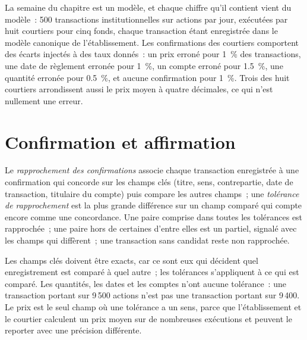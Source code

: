 La semaine du chapitre est un modèle, et chaque chiffre qu'il contient vient du modèle~: 500 transactions institutionnelles sur actions par jour, exécutées par huit courtiers pour
cinq fonds, chaque transaction étant enregistrée dans le modèle canonique de l'établissement. Les confirmations des courtiers comportent des écarts injectés à des taux donnés~: un
prix erroné pour 1~\% des transactions, une date de règlement erronée pour 1~\%, un compte erroné pour 1.5~\%, une quantité erronée pour 0.5~\%, et aucune
confirmation pour 1~\%. Trois des huit courtiers arrondissent aussi le prix moyen à quatre décimales, ce qui n'est nullement une erreur.

\section{Confirmation et affirmation}

\begin{definition}\label{def:pl:post-trade-systems:matching}
Le \emph{rapprochement des confirmations} associe chaque transaction enregistrée à une confirmation qui concorde sur les champs clés (titre,
sens, contrepartie, date de transaction, titulaire du compte) puis compare les autres champs~; une \emph{tolérance de rapprochement} est
la plus grande différence sur un champ comparé qui compte encore comme une concordance. Une paire comprise dans toutes les tolérances est rapprochée~; une paire hors de certaines d'entre elles est un
 partiel, signalé avec les champs qui diffèrent~; une transaction sans candidat reste non rapprochée.
\end{definition}

\label{lst:pl:post-trade-systems:match}

Les champs clés doivent être exacts, car ce sont eux qui décident quel enregistrement est comparé à quel autre~; les tolérances s'appliquent à ce qui est comparé. Les quantités,
les dates et les comptes n'ont aucune tolérance~: une transaction portant sur 9\,500 actions n'est pas une transaction portant sur 9\,400. Le prix est le seul champ où une tolérance
a un sens, parce que l'établissement et le courtier calculent un prix moyen sur de nombreuses exécutions et peuvent le reporter avec une précision différente.

